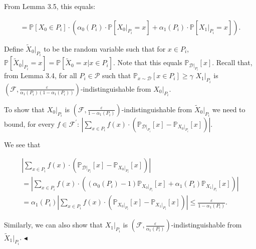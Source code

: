 From Lemma 3.5, this equals:\par


\[\begin{gathered}
=\mathbb{P}[X_{0}\in P_{i}]\cdot\left(\alpha_{0}(P_{i})\cdot\mathbb{P}[X_{0}|_{P_{i}}=x]+\alpha_{1}(P_{i})\cdot\mathbb{P}[X_{1}|_{P_{i}}=x]\right).
\end{gathered}\]


Define $\widetilde{X}_{0}|_{P_{i}}$ to be the random variable such that for $x\in P_{i}$, $\mathbb{P}[\widetilde{X}_{0}|_{P_{i}}=x]=\mathbb{P}[\widetilde{X}_{0}=x|x\in P_{i}]$. Note that this equals $\mathbb{P}_{\mathcal{D}|_{P_{i}}}[x]$. Recall that, from Lemma 3.4, for all $P_{i}\in\mathcal{P}$ such that $\mathbb{P}_{x\sim\mathcal{D}}[x\in P_{i}]\geq\gamma$ $X_{1}|_{P_{i}}$ is $(\mathcal{F},\frac{\varepsilon}{\alpha_{1}(P_{i})(1-\alpha_{1}(P_{i}))})$-indistinguishable from $X_{0}|_{P_{i}}$.\par




To show that $X_{0}|_{P_{i}}$ is $(\mathcal{F},\frac{\varepsilon}{1-\alpha_{1}(P_{i})})$-indistinguishable from $\widetilde{X}_{0}|_{P_{i}}$ we need to bound, for every $f\in\mathcal{F}^{\prime}$:
$\left|\sum_{x\in P_{i}}f(x)\cdot\left(\mathbb{P}_{\mathcal{D}|_{P_{i}}}[x]-\mathbb{P}_{X_{0}|_{P_{i}}}[x]\right)\right|.$\par




We see that\par


\[\begin{gathered}
\displaystyle\left|\sum_{x\in P_{i}}f(x)\cdot\left(\mathbb{P}_{\mathcal{D}|_{P_{i}}}[x]-\mathbb{P}_{X_{0}|_{P_{i}}}[x]\right)\right| \\
\displaystyle=\left|\sum_{x\in P_{i}}f(x)\cdot\left((\alpha_{0}(P_{i})-1)\mathbb{P}_{X_{0}|_{P_{i}}}[x]+\alpha_{1}(P_{i})\mathbb{P}_{X_{1}|_{P_{i}}}[x]\right)\right| \\
\displaystyle=\alpha_{1}(P_{i})\left|\sum_{x\in P_{i}}f(x)\cdot\left(\mathbb{P}_{X_{0}|_{P_{i}}}[x]-\mathbb{P}_{X_{1}|_{P_{i}}}[x]\right)\right|\leq\frac{\varepsilon}{1-\alpha_{1}(P_{i})}.
\end{gathered}\]


Similarly, we can also show that $X_{1}|_{P_{i}}$ is $(\mathcal{F},\frac{\varepsilon}{\alpha_{1}(P_{i})})$-indistinguishable from $\widetilde{X}_{1}|_{P_{i}}$.
$\blacktriangleleft$\par





